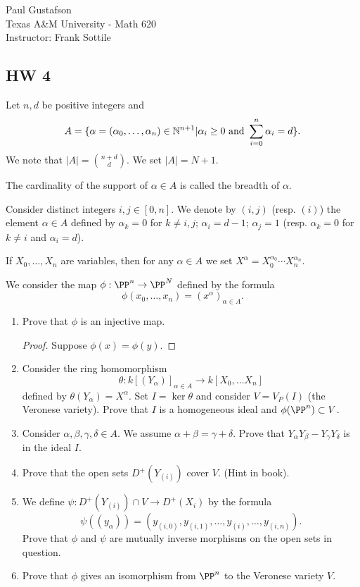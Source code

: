 \documentclass{article}
\begin{document}
\noindent Paul Gustafson\\
\noindent Texas A\&M University - Math 620\\ 
\noindent Instructor: Frank Sottile

\subsection*{HW 4}
 Let  $n, d$ be positive integers and 
$$ A = \{\alpha = (\alpha_0, \ldots, \alpha_n) \in \mathbb{N}^{n+1} | \alpha_i \ge 0 \text{ and } \sum_{i=0}^n \alpha_i = d \}.$$
We note that $|A| = {{n+d} \choose d }$. We set $|A| = N + 1$.

The cardinality of the support of $\alpha \in A$ is called the breadth of $\alpha$.

Consider distinct integers $i,j \in [0,n]$. We denote by $(i,j)$ (resp. $(i)$) the element $\alpha \in A$ defined by $\alpha_k = 0$ for $k \neq i,j$; $\alpha_i = d- 1$; $\alpha_j = 1$ (resp. $\alpha_k = 0$ for $k \neq i$ and $\alpha_i = d$).

If $X_0, \ldots, X_n$ are variables, then for any $\alpha \in A$ we set $X^\alpha = X_0^{\alpha_0} \cdots X_n^{\alpha_n}$.

We consider the map $\phi : \PP^n \to \PP^N$ defined by the formula
$$\phi(x_0, \ldots, x_n) = (x^\alpha)_{\alpha \in A}.$$
\begin{enumerate}[1)]
\item Prove that $\phi$ is an injective map.
\begin{proof}
Suppose $\phi(x) = \phi(y)$. 
\end{proof}

\item Consider the ring homomorphism
$$\theta : k[(Y_\alpha)]_{\alpha \in A} \to k[X_0, \ldots X_n]$$
defined by $\theta(Y_\alpha) = X^\alpha$. Set $I = \ker \theta$ and consider $V = V_P(I)$ (the Veronese variety).
Prove that $I$ is a homogeneous ideal and $\phi(\PP^n) \subset V$.
\item Consider $\alpha, \beta, \gamma, \delta \in A$. We assume $\alpha + \beta = \gamma + \delta$. Prove that $Y_\alpha Y_\beta - Y_\gamma Y_\delta$ is in the ideal $I$.
\item Prove that the open sets $D^+(Y_{(i)})$ cover $V$. (Hint in book).
\item We define $\psi : D^+(Y_{(i)}) \cap V \to D^+(X_i)$ by the formula
$$\psi((y_\alpha)) = (y_{(i,0)}, y_{(i,1)}, \ldots, y_{(i)}, \ldots, y_{(i,n)}).$$
Prove that $\phi$ and $\psi$ are mutually inverse morphisms on the open sets in question.
\item Prove that $\phi$ gives an isomorphism from $\PP^n$ to the Veronese variety $V$.
\end{enumerate}
\end{document}
